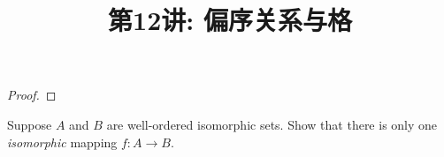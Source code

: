 \documentclass[a4paper, justified]{tufte-handout}
\title{第12讲: 偏序关系与格}
\date{\zhtoday} %
\begin{document}
\maketitle
\noplagiarism %
\begin{abstract}
  \begin{center}{}
  \end{center}
\end{abstract}
\beginrequired

\begin{problem}[SM Problem 14.44]
\end{problem}

\begin{solution}
\end{solution}

\begin{problem}[SM Problem 14.58]
\end{problem}

\begin{proof}
\end{proof}

\begin{problem}[SM Problem 14.62]
  Suppose $A$ and $B$ are well-ordered isomorphic sets. 
  Show that there is only one {\it isomorphic} mapping
  $f: A \to B$.
\end{problem}

\begin{solution}
\end{solution}

\begin{problem}[SM Problem 14.71]
\end{problem}

\begin{solution}
\end{solution}

\begin{problem}[SM Problem 14.72]
\end{problem}
\end{document}
